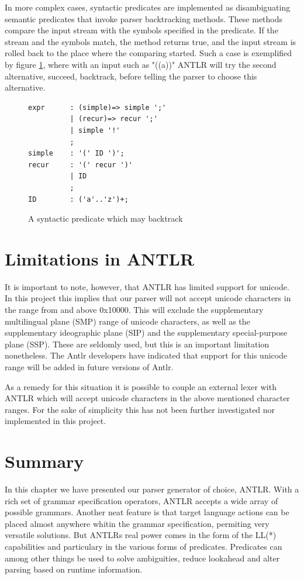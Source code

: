 In more complex cases, syntactic predicates are implemented as disambiguating semantic predicates that invoke parser backtracking methods. These methods compare the input stream with the symbols specified in the predicate. If the stream and the symbols match, the method returns true, and the input stream is rolled back to the place where the comparing started. Such a case is exemplified by figure \ref{code:complexSyntactic}, where with an input such as "((a))" ANTLR will try the second alternative, succeed, backtrack, before telling the parser to choose this alternative.
\begin{figure}[h!]
\begin{verbatim}
expr      : (simple)=> simple ';'
          | (recur)=> recur ';'  
          | simple '!'
          ;
simple    : '(' ID ')';
recur     : '(' recur ')'
          | ID
          ;
ID        : ('a'..'z')+;
\end{verbatim}
\caption{A syntactic predicate which may backtrack}
\label{code:complexSyntactic}
\end{figure}

\section{Limitations in ANTLR}
\label{sect:parserconstructanddebug:limitations}
It is important to note, however, that ANTLR has limited support for unicode.
In this project this implies that our parser will not accept unicode characters
in the range from and above 0x10000. This will exclude the supplementary
multilingual plane (SMP) range of unicode characters, as well as the
supplementary ideographic plane (SIP) and the supplementary special-purpose
plane (SSP). These are seldomly used, but this is an important limitation
nonetheless. The Antlr developers have indicated that support for this unicode
range will be added in future versions of Antlr.

As a remedy for this situation it is possible to couple an external lexer with
ANTLR which will accept unicode characters in the above mentioned character
ranges. For the sake of simplicity this has not been further investigated nor
implemented in this project.

\section{Summary}
In this chapter we have presented our parser generator of choice, ANTLR. With a rich set of grammar specification operators, ANTLR accepts a wide array of possible grammars. Another neat feature is that target language actions can be placed almost anywhere whitin the grammar specification, permiting very versatile solutions. But ANTLRs real power comes in the form of the LL(*) capabilities and particulary in the various forms of predicates. Predicates can among other things be used to solve ambiguities, reduce lookahead and alter parsing based on runtime information. 

